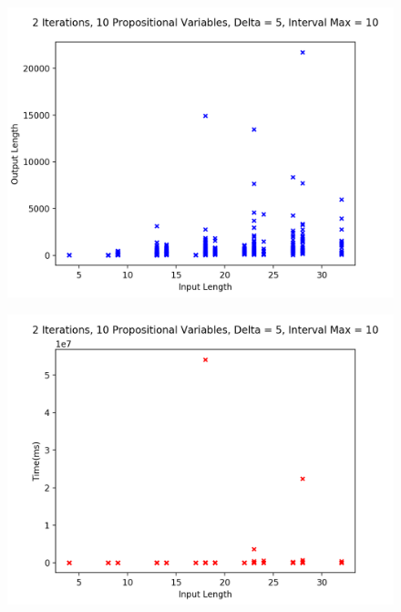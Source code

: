 \documentclass[runningheads]{llncs}
\begin{document}
\begin{minipage}{0.5 \textwidth}
    \begin{figure}[H]
    \centering
    \includegraphics[scale=0.39]{images/Sim3Length.png}
    \end{figure}
\end{minipage}%
\begin{minipage}{0.5 \textwidth}
    \begin{figure}[H]
    \centering
    \includegraphics[scale=0.39]{images/Sim3Time.png}
    \end{figure}
\end{minipage}%
\end{document}
